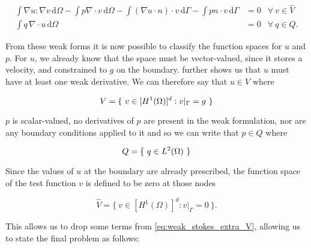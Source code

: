\documentclass[thesis]{subfiles}
\begin{document}
\begin{subequations}
  \begin{align}
    \int \nabla u : \nabla v \, \textrm{d}\Omega
    - \int p \nabla \cdot v \, \textrm{d}\Omega
    - \int (\nabla u \cdot n) \cdot v \, \textrm{d}\Gamma
    - \int p n \cdot v \, \textrm{d}\Gamma
    &= 0
    &\forall \ v \in \hat V
    \label{eq:weak_stokes_extra_V} \\
    \int q \, \nabla \cdot u \, \textrm{d}\Omega
    &= 0
    &\forall \ q \in Q.
    \label{eq:weak_stokes_extra_Q}
  \end{align}
  \label{eq:weak_stokes_extra}
\end{subequations}

From these weak forms it is now possible to classify the function spaces for $u$ and $p$.
For $u$, we already know that the space must be vector-valued, since it stores a velocity, and constrained to $g$ on the boundary.
 further shows us that $u$ must have at least one weak derivative.
We can therefore say that $u \in V$ where

\begin{equation}
  V = \{ \ v \in [H^1(\Omega)]^d : v |_{\Gamma} = g \ \}  \\
  \label{eq:stokes_velocity_space}
\end{equation}

$p$ is scalar-valued, no derivatives of $p$ are present in the weak formulation, nor are any boundary conditions applied to it and so we can write that $p \in Q$ where

\begin{equation}
  Q = \{ \ q \in L^2(\Omega) \ \}  \\
  \label{eq:stokes_pressure_space}
\end{equation}

Since the values of $u$ at the boundary are already prescribed, the function space of the test function $v$ is defined to be zero at those nodes

\begin{equation*}
  \hat V = \{\ v \in [H^1(\Omega)]^d : v|_{\Gamma} = 0 \ \}.
\end{equation*}

This allows us to drop some terms from \cref{eq:weak_stokes_extra_V}, allowing us to state the final problem as follows:
\end{document}
